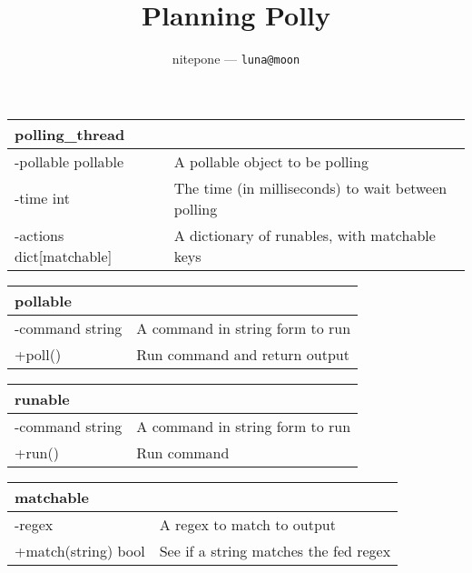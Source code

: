 \documentclass[12pt]{article}
\title{
	Planning Polly
}
\author{
	nitepone --- \texttt{luna@moon}
}
\begin{document}
\maketitle

\begin{tabular}{|l l|}
	\hline
	polling\_thread&\\
	\hline
	-pollable pollable  & A pollable object to be polling\\
	-time int  & The time (in milliseconds) to wait between polling\\
	-actions dict[matchable] & A dictionary of runables, with matchable keys\\
	\hline

\end{tabular}

\begin{tabular}{|l l|}
	\hline
	pollable&\\
	\hline
	-command string & A command in string form to run\\
	\hline
	+poll() & Run command and return output\\
	\hline
\end{tabular}

\begin{tabular}{|l l|}
	\hline
	runable&\\
	\hline
	-command string & A command in string form to run\\
	\hline
	+run() & Run command\\
	\hline
\end{tabular}

\begin{tabular}{|l l|}
	\hline
	matchable&\\
	\hline
	-regex & A regex to match to output\\
	\hline
	+match(string) bool & See if a string matches the fed regex\\
	\hline

\end{tabular}
\end{document}
